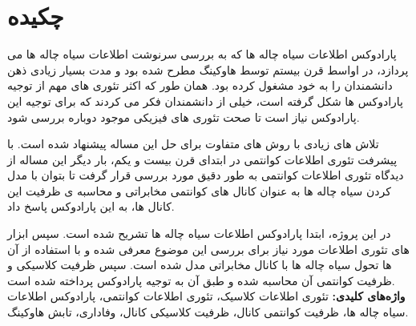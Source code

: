 
\section*{چکیده}
\begin{spacing}{2}

پارادوکس اطلاعات سیاه چاله ها که به بررسی سرنوشت اطلاعات سیاه چاله ها می پردازد، در اواسط قرن بیستم توسط هاوکینگ مطرح شده بود و مدت بسیار زیادی ذهن دانشمندان را به خود مشغول کرده بود. همان طور که اکثر تئوری های مهم از  توجیه پارادوکس ها شکل گرفته است، خیلی از دانشمندان فکر می کردند که برای توجیه این پارادوکس نیاز است تا صحت تئوری های فیزیکی موجود دوباره بررسی شود.

تلاش های زیادی با روش های متفاوت برای حل این مساله پیشنهاد شده است. با پیشرفت تئوری اطلاعات کوانتمی در ابتدای قرن بیست و یکم، بار دیگر این مساله از دیدگاه  تئوری اطلاعات کوانتمی به طور دقیق مورد بررسی قرار گرفت تا بتوان با مدل کردن سیاه چاله ها به عنوان کانال های کوانتمی مخابراتی  و محاسبه ی ظرفیت این کانال ها، به این پارادوکس پاسخ داد.

در این پروژه، ابتدا پارادوکس اطلاعات سیاه چاله ها تشریح شده است. سپس ابزار های تئوری اطلاعات مورد نیاز برای بررسی این موضوع معرفی شده و با استفاده از آن ها تحول سیاه چاله ها با کانال مخابراتی مدل شده است. سپس ظرفیت کلاسیکی و ظرفیت کوانتمی آن محاسبه شده و طبق آن به توجیه پارادوکس پرداخته شده است.
\\
\textbf{واژه‌های کلیدی:}
تئوری اطلاعات کلاسیک، تئوری اطلاعات کوانتمی، پارادوکس اطلاعات سیاه چاله ها، ظرفیت کوانتمی کانال، ظرفیت کلاسیکی کانال، وفاداری، تابش هاوکینگ. 
\end{spacing}

\newpage\null\newpage
